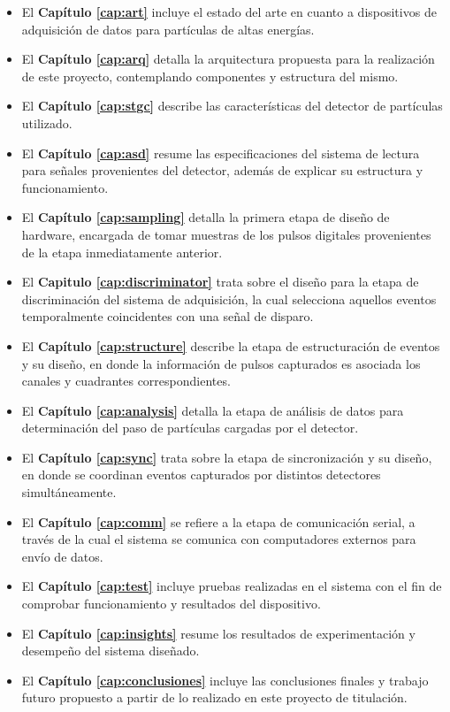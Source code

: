 	\begin{itemize}
		\item El \textbf{Capítulo \ref{cap:art}} incluye el estado del arte en cuanto a dispositivos de adquisición de datos para partículas de altas energías.
		\item El \textbf{Capítulo \ref{cap:arq}} detalla la arquitectura propuesta para la realización de este proyecto, contemplando componentes y estructura del mismo.
		\item El \textbf{Capítulo \ref{cap:stgc}} describe las características del detector de partículas utilizado.
		\item El \textbf{Capítulo \ref{cap:asd}} resume las especificaciones del sistema de lectura para señales provenientes del detector, además de explicar su estructura y funcionamiento.
		\item El \textbf{Capítulo \ref{cap:sampling}} detalla la primera etapa de diseño de hardware, encargada de tomar muestras de los pulsos digitales provenientes de la etapa inmediatamente anterior.
		\item El \textbf{Capitulo \ref{cap:discriminator}} trata sobre el diseño para la etapa de discriminación del sistema de adquisición, la cual selecciona aquellos eventos temporalmente coincidentes con una señal de disparo.
		\item El \textbf{Capítulo \ref{cap:structure}} describe la etapa de estructuración de eventos y su diseño, en donde la información de pulsos capturados es asociada los canales y cuadrantes correspondientes.
		\item El \textbf{Capítulo \ref{cap:analysis}} detalla la etapa de análisis de datos para determinación del paso de partículas cargadas por el detector.
		\item El \textbf{Capítulo \ref{cap:sync}} trata sobre la etapa de sincronización y su diseño, en donde se coordinan eventos capturados por distintos detectores simultáneamente.
		\item El \textbf{Capítulo \ref{cap:comm}} se refiere a la etapa de comunicación serial, a través de la cual el sistema se comunica con computadores externos para envío de datos.
		\item El \textbf{Capítulo \ref{cap:test}} incluye pruebas realizadas en el sistema con el fin de comprobar funcionamiento y resultados del dispositivo.
		\item El \textbf{Capítulo \ref{cap:insights}} resume los resultados de experimentación y desempeño del sistema diseñado.
		\item El \textbf{Capítulo \ref{cap:conclusiones}} incluye las conclusiones finales y trabajo futuro propuesto a partir de lo realizado en este proyecto de titulación.
	\end{itemize}
